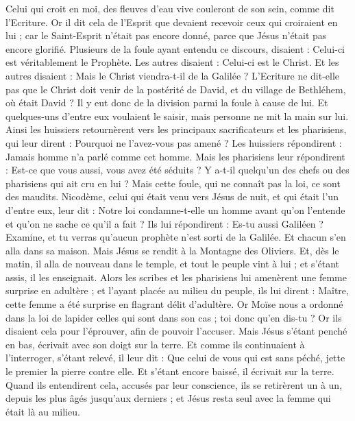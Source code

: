 \begin{multicols}{2}
Celui qui croit en moi, des fleuves d'eau vive couleront de son sein, comme dit l'Ecriture.
Or il dit cela de l'Esprit que devaient recevoir ceux qui croiraient en lui ; car le Saint-Esprit n'était pas encore donné, parce que Jésus n'était pas encore glorifié.
Plusieurs de la foule ayant entendu ce discours, disaient : Celui-ci est véritablement le Prophète.
Les autres disaient : Celui-ci est le Christ. Et les autres disaient : Mais le Christ viendra-t-il de la Galilée ?
L'Ecriture ne dit-elle pas que le Christ doit venir de la postérité de David, et du village de Bethléhem, où était David ?
Il y eut donc de la division parmi la foule à cause de lui.
Et quelques-uns d'entre eux voulaient le saisir, mais personne ne mit la main sur lui.
Ainsi les huissiers retournèrent vers les principaux sacrificateurs et les pharisiens, qui leur dirent : Pourquoi ne l'avez-vous pas amené ?
Les huissiers répondirent : Jamais homme n'a parlé comme cet homme.
Mais les pharisiens leur répondirent : Est-ce que vous aussi, vous avez été séduits ?
Y a-t-il quelqu'un des chefs ou des pharisiens qui ait cru en lui ?
Mais cette foule, qui ne connaît pas la loi, ce sont des maudits.
Nicodème, celui qui était venu vers Jésus de nuit, et qui était l'un d'entre eux, leur dit :
Notre loi condamne-t-elle un homme avant qu'on l'entende et qu'on ne sache ce qu'il a fait ?
Ils lui répondirent : Es-tu aussi Galiléen ? Examine, et tu verras qu'aucun prophète n'est sorti de la Galilée.
Et chacun s'en alla dans sa maison.
\VerseOne{}Mais Jésus se rendit à la Montagne des Oliviers.
Et, dès le matin, il alla de nouveau dans le temple, et tout le peuple vint à lui ; et s'étant assis, il les enseignait.
Alors les scribes et les pharisiens lui amenèrent une femme surprise en adultère ;
et l'ayant placée au milieu du peuple, ils lui dirent : Maître, cette femme a été surprise en flagrant délit d'adultère.
Or Moïse nous a ordonné dans la loi de lapider celles qui sont dans son cas ; toi donc qu'en dis-tu ?
Or ils disaient cela pour l'éprouver, afin de pouvoir l'accuser. Mais Jésus s'étant penché en bas, écrivait avec son doigt sur la terre.
Et comme ils continuaient à l'interroger, s'étant relevé, il leur dit : Que celui de vous qui est sans péché, jette le premier la pierre contre elle.
Et s'étant encore baissé, il écrivait sur la terre.
Quand ils entendirent cela, accusés par leur conscience, ils se retirèrent un à un, depuis les plus âgés jusqu'aux derniers ; et Jésus resta seul avec la femme qui était là au milieu.

\end{multicols}
